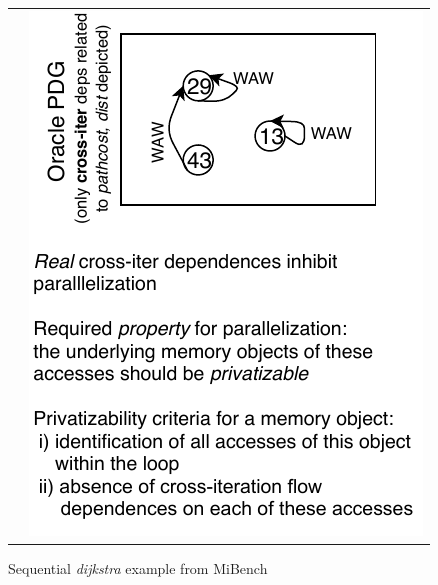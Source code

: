 \begin{figure}[t]
  \centering
  \begin{tabular}{cc}
  \scriptsize
    \subfloat{
    \begin{minipage}{5cm}
      
    \end{minipage}
    }
    &
     \hspace{0.5cm}

    \begin{minipage}{5cm}
    \includegraphics[scale=0.7]{figures/seq_motivation.pdf}
    \end{minipage}

\end{tabular}

\label{fig:dijkstra_motivation}
\caption{Sequential \textit{dijkstra} example from MiBench~\cite{}}
\end{figure}


